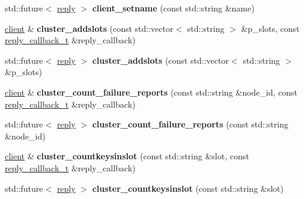\begin{DoxyCompactItemize}
std\+::future$<$ \hyperlink{classcpp__redis_1_1reply}{reply} $>$ {\bfseries client\+\_\+setname} (const std\+::string \&name)
\item 
\mbox{\label{classcpp__redis_1_1client_ac156d5593e1800742188f0eee9016a84}} 
\hyperlink{classcpp__redis_1_1client}{client} \& {\bfseries cluster\+\_\+addslots} (const std\+::vector$<$ std\+::string $>$ \&p\+\_\+slots, const \hyperlink{classcpp__redis_1_1client_a061a1140d36d2eaeda82b09a0bb3f9f2}{reply\+\_\+callback\+\_\+t} \&reply\+\_\+callback)
\item 
\mbox{\label{classcpp__redis_1_1client_a0e14578c1addf1de66745a8a95e66aeb}} 
std\+::future$<$ \hyperlink{classcpp__redis_1_1reply}{reply} $>$ {\bfseries cluster\+\_\+addslots} (const std\+::vector$<$ std\+::string $>$ \&p\+\_\+slots)
\item 
\mbox{\label{classcpp__redis_1_1client_a757c2a5c8e5b42ccd3930d89d739f602}} 
\hyperlink{classcpp__redis_1_1client}{client} \& {\bfseries cluster\+\_\+count\+\_\+failure\+\_\+reports} (const std\+::string \&node\+\_\+id, const \hyperlink{classcpp__redis_1_1client_a061a1140d36d2eaeda82b09a0bb3f9f2}{reply\+\_\+callback\+\_\+t} \&reply\+\_\+callback)
\item 
\mbox{\label{classcpp__redis_1_1client_af1ff307eb9feb58b48b11bda78131a20}} 
std\+::future$<$ \hyperlink{classcpp__redis_1_1reply}{reply} $>$ {\bfseries cluster\+\_\+count\+\_\+failure\+\_\+reports} (const std\+::string \&node\+\_\+id)
\item 
\mbox{\label{classcpp__redis_1_1client_a78017860625d016074d0495c24c3f9e8}} 
\hyperlink{classcpp__redis_1_1client}{client} \& {\bfseries cluster\+\_\+countkeysinslot} (const std\+::string \&slot, const \hyperlink{classcpp__redis_1_1client_a061a1140d36d2eaeda82b09a0bb3f9f2}{reply\+\_\+callback\+\_\+t} \&reply\+\_\+callback)
\item 
\mbox{\label{classcpp__redis_1_1client_a8135eee3cfc95b061aee9b6f7271efce}} 
std\+::future$<$ \hyperlink{classcpp__redis_1_1reply}{reply} $>$ {\bfseries cluster\+\_\+countkeysinslot} (const std\+::string \&slot)
\item 
\mbox{\label{classcpp__redis_1_1client_a41f96bb9a627724570f1866d0983d7b2}} 

\end{DoxyCompactItemize}
